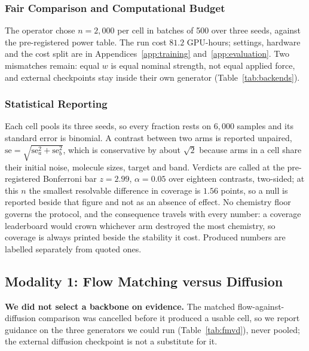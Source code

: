 \documentclass{article}
\begin{document}
\subsubsection{Fair Comparison and Computational Budget}
The operator chose $n{=}2{,}000$ per cell in batches of 500 over three seeds, against the pre-registered power table. The run cost $81.2$ GPU-hours; settings, hardware and the cost split are in Appendices~\ref{app:training} and~\ref{app:evaluation}. Two mismatches remain: equal $w$ is equal nominal strength, not equal applied force, and external checkpoints stay inside their own generator (Table~\ref{tab:backends}).

\subsubsection{Statistical Reporting}
Each cell pools its three seeds, so every fraction rests on $6{,}000$ samples and its standard error is binomial. A contrast between two arms is reported unpaired, $\mathrm{se}=\sqrt{\mathrm{se}_a^2+\mathrm{se}_b^2}$, which is conservative by about $\sqrt2$ because arms in a cell share their initial noise, molecule sizes, target and band. Verdicts are called at the pre-registered Bonferroni bar $z{=}2.99$, $\alpha{=}0.05$ over eighteen contrasts, two-sided; at this $n$ the smallest resolvable difference in coverage is $1.56$ points, so a null is reported beside that figure and not as an absence of effect. No chemistry floor governs the protocol, and the consequence travels with every number: a coverage leaderboard would crown whichever arm destroyed the most chemistry, so coverage is always printed beside the stability it cost. Produced numbers are labelled separately from quoted ones.

\subsection{Modality 1: Flow Matching versus Diffusion}\label{sec:fmvd}
\textbf{We did not select a backbone on evidence.} The matched flow-against-diffusion comparison was cancelled before it produced a usable cell, so we report guidance on the three generators we could run (Table~\ref{tab:fmvd}), never pooled; the external diffusion checkpoint is not a substitute for it.
\end{document}
